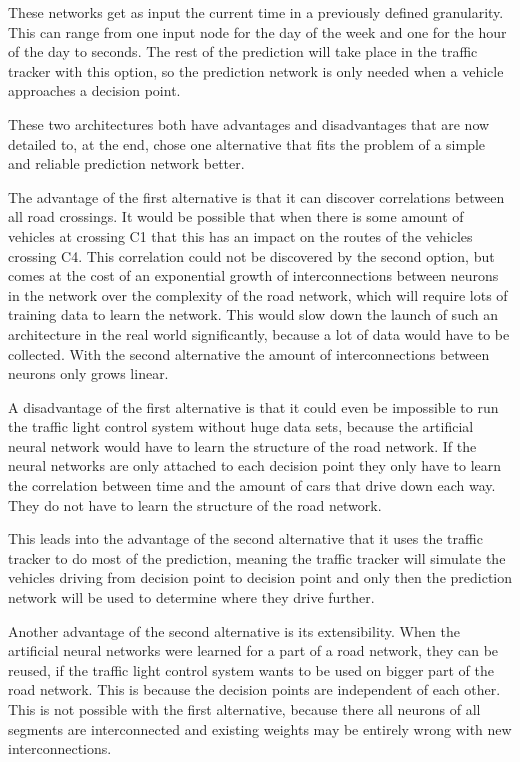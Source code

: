 These networks get as input the current time in a previously defined granularity. This can range from one input node for the day of the week and one for the hour of the day to seconds. The rest of the prediction will take place in the traffic tracker with this option, so the prediction network is only needed when a vehicle approaches a decision point.

These two architectures both have advantages and disadvantages that are now detailed to, at the end, chose one alternative that fits the problem of a simple and reliable prediction network better.

The advantage of the first alternative is that it can discover correlations between all road crossings. It would be possible that when there is some amount of vehicles at crossing C1 that this has an impact on the routes of the vehicles crossing C4. This correlation could not be discovered by the second option, but comes at the cost of an exponential growth of interconnections between neurons in the network over the complexity of the road network, which will require lots of training data to learn the network. This would slow down the launch of such an architecture in the real world significantly, because a lot of data would have to be collected. With the second alternative the amount of interconnections between neurons only grows linear.

A disadvantage of the first alternative is that it could even be impossible to run the traffic light control system without huge data sets, because the artificial neural network would have to learn the structure of the road network. If the neural networks are only attached to each decision point they only have to learn the correlation between time and the amount of cars that drive down each way. They do not have to learn the structure of the road network.

This leads into the advantage of the second alternative that it uses the traffic tracker to do most of the prediction, meaning the traffic tracker will simulate the vehicles driving from decision point to decision point and only then the prediction network will be used to determine where they drive further.

Another advantage of the second alternative is its extensibility. When the artificial neural networks were learned for a part of a road network, they can be reused, if the traffic light control system wants to be used on bigger part of the road network. This is because the decision points are independent of each other. This is not possible with the first alternative, because there all neurons of all segments are interconnected and existing weights may be entirely wrong with new interconnections.

